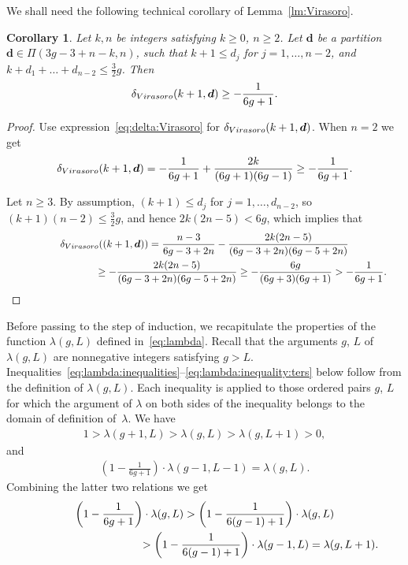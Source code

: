 \documentclass[11pt]{article}
\newtheorem{Corollary}[Theorem]{Corollary}
\theoremstyle{definition}
\begin{document}
We shall need the following technical corollary of Lemma~\ref{lm:Virasoro}.

\begin{Corollary}\label{cor:delat:Virasoro:bound}
Let $k,n$ be integers satisfying $k\ge 0$, $n\ge 2$.
Let $\boldsymbol{d}$ be a partition $\boldsymbol{d}\in\Pi(3g-3+n-k,n)$, such that
$k+1\le d_j$ for $j=1,\dots,n-2$,
and $k+d_1+\dots+d_{n-2}\le\frac{3}{2}g$.
Then
\begin{gather}\label{eq:delat:Virasoro:bound}
\delta_{\rm Virasoro}(k+1,\boldsymbol{d})\ge -\frac{1}{6g+1} .
\end{gather}
\end{Corollary}

\begin{proof}Use expression~\eqref{eq:delta:Virasoro} for
$\delta_{\rm Virasoro}(k+1,\boldsymbol{d})$.
When $n=2$ we get
\[
\delta_{\rm Virasoro}(k+1,\boldsymbol{d})=-\frac{1}{6g+1}+\frac{2k}{(6g+1)(6g-1)}\ge-\frac{1}{6g+1} .
\]

Let $n\ge 3$. By assumption, $(k+1)\le d_j$ for $j=1,\dots,d_{n-2}$, so $(k+1)(n-2)\le \frac{3}{2}g$, and hence $2k(2n-5)< 6g$, which implies that
\begin{gather*}
\delta_{\rm Virasoro}((k+1,\boldsymbol{d}))=\frac{n-3}{6g-3+2n}-\frac{2k(2n-5)}{(6g-3+2n)(6g-5+2n)}\\
\hphantom{\delta_{\rm Virasoro}((k+1,\boldsymbol{d}))}{} \ge -\frac{2k(2n-5)}{(6g-3+2n)(6g-5+2n)}
\ge -\frac{6g}{(6g+3)(6g+1)}>-\frac{1}{6g+1} .\!\!\!\tag*{\qed}
\end{gather*}\renewcommand{\qed}{}
\end{proof}

Before passing to the step of induction, we recapitulate the properties of the function $\lambda(g,L)$ defined in~\eqref{eq:lambda}.
Recall that the arguments $g$, $L$ of $\lambda(g,L)$ are nonnegative integers
satisfying $g>L$. Inequalities~\eqref{eq:lambda:inequalities}--\eqref{eq:lambda:inequality:ters}
below follow from the definition of $\lambda(g,L)$. Each inequality is
applied to those ordered pairs $g$, $L$ for which the argument of $\lambda$ on
both sides of the inequality belongs to the domain of definition of~$\lambda$. We have
\begin{gather}\label{eq:lambda:inequalities}
1>\lambda(g+1,L)>\lambda(g,L)>\lambda(g,L+1)>0 ,
\end{gather}
and
\begin{gather}\label{eq:lambda:inequality:bis}
\left(1-\frac{1}{6g+1}\right)
\cdot\lambda(g-1,L-1)=\lambda(g,L) .
\end{gather}
Combining the latter two relations we get
\begin{gather}
\left(1-\frac{1}{6g+1}\right)\cdot\lambda(g,L)>\left(1-\frac{1}{6(g-1)+1}\right)\cdot\lambda(g,L)\nonumber\\
\hphantom{\left(1-\frac{1}{6g+1}\right)\cdot\lambda(g,L)}{} >\left(1-\frac{1}{6(g-1)+1}\right)
\cdot\lambda(g-1,L) =\lambda(g,L+1) .\label{eq:lambda:inequality:ters}
\end{gather}
\end{document}
